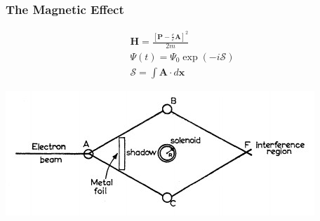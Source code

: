 \documentclass{article}
\begin{document}
\subsubsection{The Magnetic Effect}\label{sssec:magnetic_effect}
  
  \begin{minipage}{0.45\textwidth}
    \begin{align*}
      &\bm{H} = \frac{\left[ \bm{P} - \frac{e}{c}\bm{A} \right]^{2}}{2m} &\\
      &\Psi(t) = \Psi_{0} \exp(-i \mathcal{S}) &\\
      &\mathcal{S} = \int \bm{A} \cdot d\bm{x} &
    \end{align*}
  \end{minipage}
  \hspace{0.05\textwidth}
  \begin{minipage}{0.5\textwidth}
    \includegraphics[width=\textwidth]{magnetic_effect}
    \label{fig:AME}
  \end{minipage}



\end{document}
